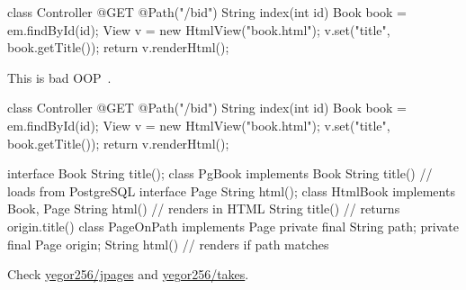\documentclass{article}
\begin{document}

\begin{pptWide}{2}
{\small\begin{ffcode}
class Controller {
  @GET
  @Path("/b{id}")
  String index(int id) {
    Book book = em.findById(id);
    View v = new HtmlView("book.html");
    v.set("title", book.getTitle());
    return v.renderHtml();
  }
}
\end{ffcode}
}
\par\columnbreak\par
{}\par
This is bad OOP~\citep{bugayenko2016blog1213}.
\end{pptWide}
\par
\plush{}

\begin{pptWide}{2}
{\small\begin{ffcode}
class Controller {
  @GET
  @Path("/b{id}")
  String index(int id) {
    Book book = em.findById(id);
    View v = new HtmlView("book.html");
    v.set("title", book.getTitle());
    return v.renderHtml();
  }
}
\end{ffcode}
}
\par\columnbreak\par
{\scriptsize\begin{ffcode}
interface Book
  String title();
class PgBook implements Book
  String title() // loads from PostgreSQL
interface Page
  String html();
class HtmlBook implements Book, Page
  String html() // renders in HTML
  String title() // returns origin.title()
class PageOnPath implements Page
  private final String path;
  private final Page origin;
  String html() // renders if path matches
\end{ffcode}
}
\end{pptWide}
\par
Check \href{https://github.com/yegor256/jpages}{yegor256/jpages} and \href{https://github.com/yegor256/takes}{yegor256/takes}.
\plush{}
\end{document}
